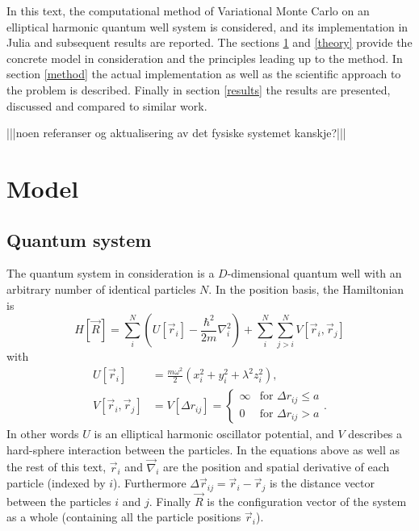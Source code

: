 \documentclass[a4paper,8pt]{article}
\begin{document}
\begin{multicols}{2}
In this text, the computational method of Variational Monte Carlo on an elliptical harmonic quantum well system is considered, and its implementation in Julia and subsequent results are reported. The sections \ref{model} and \ref{theory} provide the concrete model in consideration and the principles leading up to the method. In section \ref{method} the actual implementation as well as the scientific approach to the problem is described. Finally in section \ref{results} the results are presented, discussed and compared to similar work.

|||noen referanser og aktualisering av det fysiske systemet kanskje?|||


\section{Model} \label{model}

\subsection{Quantum system} \label{system}
The quantum system in consideration is a $D$-dimensional quantum well with an arbitrary number of identical particles $N$. In the position basis, the Hamiltonian is
\begin{equation}
H[\vec{R}] = \sum\limits_i^N \left(U[\vec{r}_i] -\frac{\hbar^2}{2m}\nabla_i^2 \right) + \sum\limits_i^N\sum\limits_{j > i}^N V[\vec{r}_i,\vec{r}_j]
\end{equation}
with
\begin{align}
U[\vec{r}_i] &= \frac{m\omega^2}{2}\left(x_i^2+y_i^2+\lambda^2z_i^2\right), \\
V[\vec{r}_i,\vec{r}_j] &= V[\Delta{r}_{ij}] =\begin{cases} \infty & \text{for $\Delta{r}_{ij} \leq a$} \\
0 & \text{for $\Delta{r}_{ij} > a$} \end{cases}.
\end{align}
In other words $U$ is an elliptical harmonic oscillator potential, and $V$ describes a hard-sphere interaction between the particles. In the equations above as well as the rest of this text, $\vec{r}_i$ and $\vec{\nabla}_i$ are the position and spatial derivative of each particle (indexed by $i$). Furthermore $\Delta\vec{r}_{ij} = \vec{r}_i-\vec{r}_j$ is the distance vector between the particles $i$ and $j$. Finally $\vec{R}$ is the configuration vector of the system as a whole (containing all the particle positions $\vec{r}_i$).


\end{multicols}
\end{document}
